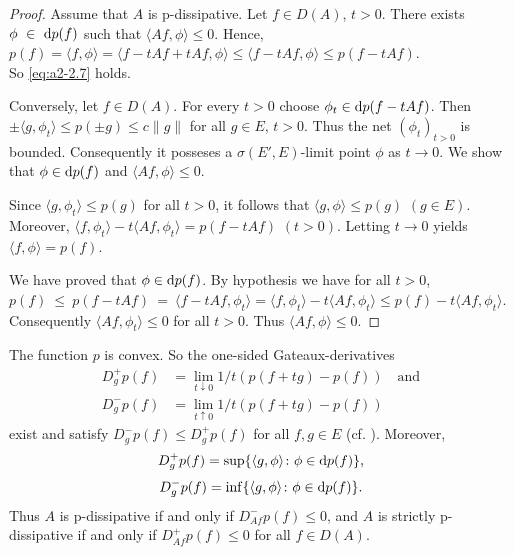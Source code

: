 \begin{proof}
Assume that $A$ is p-dissipative.
Let $f \in D(A)$, $t > 0$.
There exists $\phi~\in~\mathop{}\!\mathrm{d}{p}(f)$ such that $\langle Af,\phi \rangle \leq 0$.
Hence, \\
$p(f) = \langle f,\phi \rangle = \langle f - tAf + tAf, \phi \rangle \leq \langle f - tAf,\phi \rangle \leq p(f - tAf)$. \\
So \eqref{eq:a2-2.7} holds.

Conversely, let $f \in D(A)$.
For every $t > 0$ choose $\phi_{t} \in \mathop{}\!\mathrm{d}{p}(f - tAf)$.
Then $\pm\langle g,\phi_{t} \rangle \leq p(\pm g) \leq c\|g\|$ for all $g \in E$, $t > 0$.
Thus the net $(\phi_{t})_{t>0}$ is bounded.
Consequently it posseses a $\sigma(E',E)$-limit point $\phi$ as $t \to 0$.
We show that $\phi \in \mathop{}\!\mathrm{d}{p}(f)$ and $\langle Af,\phi \rangle \leq 0$.

Since $\langle g,\phi_{t} \rangle \leq p(g)$ for all $t > 0$, it follows that $\langle g,\phi \rangle \leq p(g)$ $(g \in E)$.
Moreover, $\langle f,\phi_{t} \rangle - t\langle Af, \phi_{t} \rangle = p(f - tAf)$ $(t > 0)$.
Letting $t \to 0$ yields $\langle f,\phi \rangle = p(f)$.

We have proved that $\phi \in \mathop{}\!\mathrm{d}{p}(f)$.
By hypothesis we have for all $t > 0$, \\
$p(f)~\leq~p(f-tAf)~=~\langle f-tAf,\phi_{t} \rangle 
= \langle f,\phi_{t} \rangle - t\langle Af,\phi_{t} \rangle \leq p(f) - t\langle Af,\phi_{t} \rangle$.
Consequently $\langle Af,\phi_{t} \rangle \leq 0$ for all $t > 0$.
Thus $\langle Af,\phi \rangle \leq 0$.
\end{proof}
\begin{remark}\label{rem:a2-2.4}
The function $p$ is convex.
So the one-sided Gateaux-derivatives
\begin{align*}
D^{+}_{g} p(f) &= \lim_{t \downarrow 0} 1/t (p(f+tg) - p(f)) \quad \text{and} \\
D^{-}_{g} p(f) &= \lim_{t \uparrow 0} 1/t (p(f+tg) - p(f))
\end{align*}
exist and satisfy $D^{-}_{g}p(f) \leq D^{+}_{g}p(f)$ for all $f, g \in E$ (cf. \citet{moreau:1966}).
Moreover,
\begin{equation}\label{eq:a2-2.9}
D^{+}_{g} p(f) = \sup \{\langle g,\phi \rangle \colon \phi \in \mathop{}\!\mathrm{d}{p}(f)\},
\end{equation}
\begin{equation}\label{eq:a2-2.10}
D^{-}_{g} p(f) = \inf \{\langle g,\phi \rangle \colon \phi \in \mathop{}\!\mathrm{d}{p}(f)\}.
\end{equation}
Thus $A$ is p-dissipative if and only if $D^{-}_{Af} p(f) \leq 0$, and $A$ is strictly p-dissipative if and only if $D^{+}_{Af} p(f) \leq 0$ for all $f \in D(A)$.
\end{remark}
